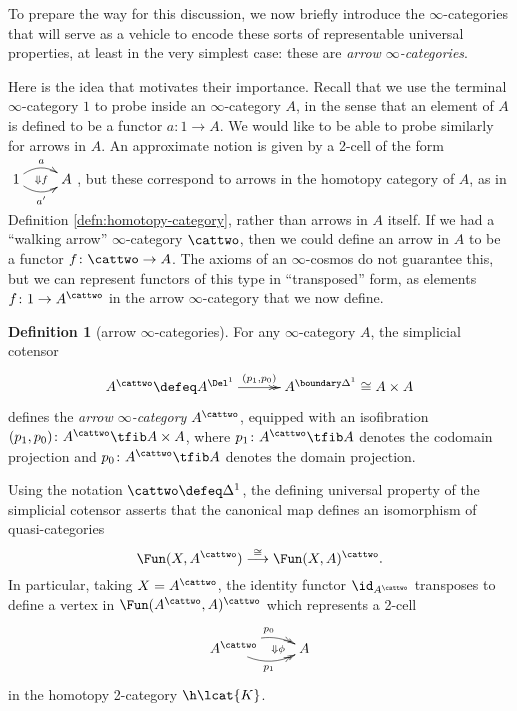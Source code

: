\documentclass[12pt,reqno]{amsart}
\theoremstyle{plain}
\theoremstyle{definition}
\newtheorem{defn}[thm]{Definition}
\theoremstyle{remark}
\numberwithin{equation}{subsection}
\begin{document}
To prepare the way for this discussion, we now briefly introduce the $\infty$-categories that will serve as  a vehicle to encode these sorts of representable universal properties, at least in the very simplest case: these are \emph{arrow $\infty$-categories}. 

Here is the idea that motivates their importance. Recall that we use the terminal $\infty$-category $1$ to probe inside an $\infty$-category $A$, in the sense that an element of $A$ is defined to be a functor $a \colon 1 \to A$. We would like to be able to probe similarly for arrows in $A$. An approximate notion is given by a 2-cell of the form $\xymatrix{1 \ar@/^2ex/[r]^a \ar@/_2ex/[r]_{a'} \ar@{}[r]|{\Downarrow f} & A}$, but these correspond to arrows in the homotopy category of $A$, as in Definition \ref{defn:homotopy-category}, rather than arrows in $A$ itself. If we had a ``walking arrow'' $\infty$-category $\cattwo$, then we could define an arrow in $A$ to be a functor $f\colon \cattwo \to A$. The axioms of an $\infty$-cosmos do not guarantee this, but we can represent functors of this type in ``transposed'' form, as elements $f \colon 1 \to A^\cattwo$ in the arrow $\infty$-category that we now define.



\begin{defn}[arrow $\infty$-categories] For any $\infty$-category $A$, the simplicial cotensor 
\[ \xymatrix@C=30pt{ A^\cattwo \defeq A^{\Del^1} \ar@{->>}[r]^-{(p_1,p_0)} & {A^{\boundary\Delta^1}} \cong A \times A}\] defines the \emph{arrow $\infty$-category} $A^\cattwo$, equipped with an isofibration $(p_1,p_0)\colon A^\cattwo \tfib A \times A$, where $p_1 \colon A^\cattwo \tfib A$ denotes the codomain projection and $p_0 \colon A^\cattwo \tfib A$ denotes the domain projection.
\end{defn}

Using the notation $\cattwo \defeq \Delta^1$, the defining universal property of the simplicial cotensor asserts that the canonical map defines an isomorphism of quasi-categories
\[ \Fun(X, A^\cattwo) \stackrel{\cong}{\longrightarrow} \Fun(X,A)^{\cattwo}.\]  In particular, taking $X=A^\cattwo$, the identity functor $\id_{A^\cattwo}$ transposes to define a vertex in $\Fun(A^\cattwo,A)^\cattwo$ which represents a 2-cell
\begin{equation}\label{eq:generic-arrow} \xymatrix{ A^\cattwo \ar@{->>}@/^2ex/[r]^{p_0} \ar@{->>}@/_2ex/[r]_{p_1} \ar@{}[r]|-{\Downarrow\phi} & A}\end{equation} in the homotopy 2-category $\h\lcat{K}$.
\end{document}
